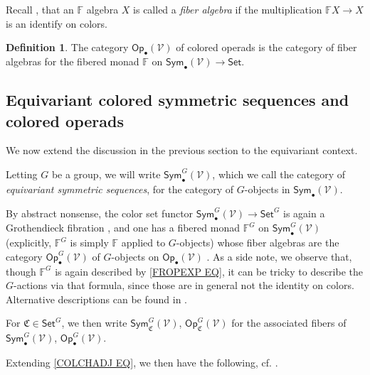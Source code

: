 \documentclass[a4paper,10pt
 ,final
]{article}%
\numberwithin{equation}{section}
\numberwithin{figure}{section}
\theoremstyle{definition} %
\newtheorem{definition}[equation]{Definition}%
\newcommand{\V}{\ensuremath{\mathcal V}}
\newcommand{\1}{\ensuremath{\mathbbm 1}}%
\begin{document}
Recall \cite[Def. \ref{OC-FIBMON DEF}]{BP_FCOP},
that an $\mathbb{F}$ algebra $X$
is called a \emph{fiber algebra}
if the multiplication 
$\mathbb{F} X \to X$
is an identify on colors.


\begin{definition}
	The category 
	$\mathsf{Op}_{\bullet}(\V)$
	of colored operads
	is the category of fiber algebras for
	the fibered monad $\mathbb{F}$ on
	$\mathsf{Sym}_{\bullet}(\V) \to \mathsf{Set}$.
\end{definition}








\subsection{Equivariant colored symmetric sequences and colored operads}
\label{EQCOSYMSEQ SEC}



We now extend the discussion in the previous section to the equivariant context.

Letting $G$ be a group,
we will write
$\mathsf{Sym}^G_{\bullet}(\V)$,
which we call the category of
\emph{equivariant symmetric sequences},
for the category of $G$-objects in $\mathsf{Sym}_{\bullet}(\V)$.

By abstract nonsense, 
the color set functor
$\mathsf{Sym}^G_{\bullet}(\V) 
\to \mathsf{Set}^G$
is again a Grothendieck fibration
\cite[Rem. \ref{OC-FUNISGROTH REM}]{BP_FCOP},
and one has a fibered monad
$\mathbb{F}^G$ on $\mathsf{Sym}^G_{\bullet}(\V)$
(explicitly, $\mathbb{F}^G$
is simply $\mathbb{F}$ applied to $G$-objects)
whose fiber algebras
are the category 
$\mathsf{Op}^G_{\bullet}(\V)$
of $G$-objects on $\mathsf{Op}_{\bullet}(\V)$
\cite[Prop. \ref{OC-DIAGRAMFM_PROP}]{BP_FCOP}.
As a side note, we observe that, 
though $\mathbb{F}^G$ is again described by 
\eqref{FROPEXP EQ},
it can be tricky to describe the $G$-actions via that formula, 
since those are in general not the identity on colors.
Alternative descriptions can be found in 
\cite[Prop. \ref{OC-FGC PROP} and Rem. \ref{OC-FROPEXPG REM}]{BP_FCOP}.

For $\mathfrak{C} \in \mathsf{Set}^G$,
we then write
$\mathsf{Sym}^G_{\mathfrak{C}}(\V)$,
$\mathsf{Op}^G_{\mathfrak{C}}(\V)$
for the associated fibers of
$\mathsf{Sym}^G_{\bullet}(\V)$,
$\mathsf{Op}^G_{\bullet}(\V)$.

Extending \eqref{COLCHADJ EQ},
we then have the following, 
cf. \cite[Rem. \ref{OC-OP_MAP REM}]{BP_FCOP}.
\end{document}
